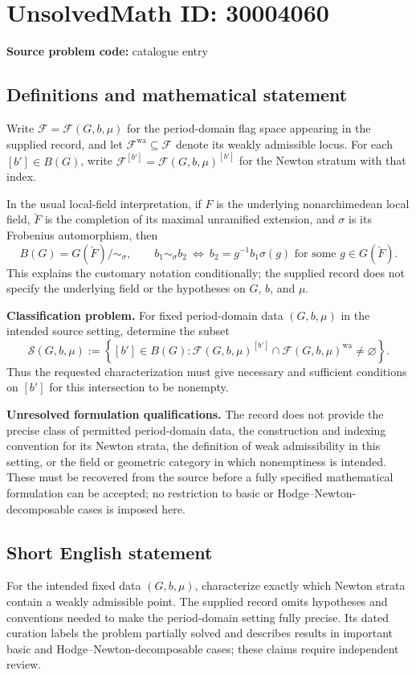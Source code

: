 \documentclass[11pt]{article}
\begin{document}
\section*{UnsolvedMath ID: 30004060}
\textbf{Source problem code:} catalogue entry
\subsection{Definitions and mathematical statement}
Write \(\mathcal F=\mathcal F(G,b,\mu)\) for the period-domain flag space appearing in the supplied record, and let \(\mathcal F^{\mathrm{wa}}\subseteq\mathcal F\) denote its weakly admissible locus. For each \([b']\in B(G)\), write \(\mathcal F^{[b']}=\mathcal F(G,b,\mu)^{[b']}\) for the Newton stratum with that index.

In the usual local-field interpretation, if \(F\) is the underlying nonarchimedean local field, \(\breve F\) is the completion of its maximal unramified extension, and \(\sigma\) is its Frobenius automorphism, then
\[
B(G)=G(\breve F)/{\sim_\sigma},\qquad
b_1\sim_\sigma b_2\ \Longleftrightarrow\ 
b_2=g^{-1}b_1\sigma(g)\text{ for some }g\in G(\breve F).
\]
This explains the customary notation conditionally; the supplied record does not specify the underlying field or the hypotheses on \(G\), \(b\), and \(\mu\).

\textbf{Classification problem.} For fixed period-domain data \((G,b,\mu)\) in the intended source setting, determine the subset
\[
\mathcal S(G,b,\mu)
:=\left\{[b']\in B(G):
\mathcal F(G,b,\mu)^{[b']}\cap
\mathcal F(G,b,\mu)^{\mathrm{wa}}
\neq\varnothing\right\}.
\]
Thus the requested characterization must give necessary and sufficient conditions on \([b']\) for this intersection to be nonempty.

\textbf{Unresolved formulation qualifications.} The record does not provide the precise class of permitted period-domain data, the construction and indexing convention for its Newton strata, the definition of weak admissibility in this setting, or the field or geometric category in which nonemptiness is intended. These must be recovered from the source before a fully specified mathematical formulation can be accepted; no restriction to basic or Hodge--Newton-decomposable cases is imposed here.
\subsection{Short English statement}
For the intended fixed data \((G,b,\mu)\), characterize exactly which Newton strata contain a weakly admissible point. The supplied record omits hypotheses and conventions needed to make the period-domain setting fully precise. Its dated curation labels the problem partially solved and describes results in important basic and Hodge--Newton-decomposable cases; these claims require independent review.
\end{document}
